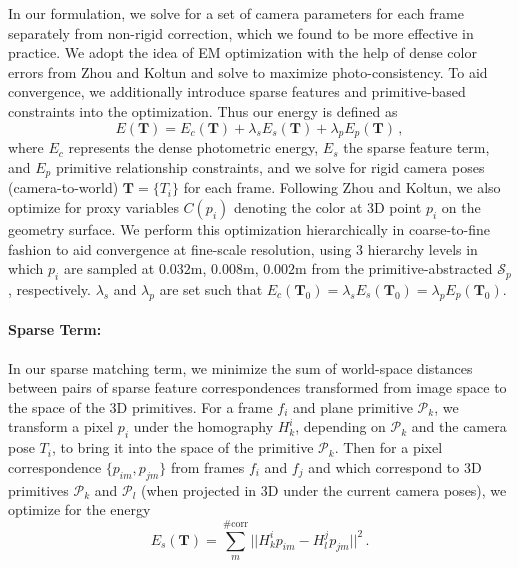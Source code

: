 In our formulation, we solve for a set of camera parameters for each frame separately from non-rigid correction, which we found to be more effective in practice. 
We adopt the idea of EM optimization with the help of dense color errors from Zhou and Koltun and solve to maximize photo-consistency.
To aid convergence, we additionally introduce sparse features and primitive-based constraints into the optimization.
Thus our energy is defined as
$$ E(\mathbf{T})=E_c(\mathbf{T}) + \lambda_s E_s(\mathbf{T}) + \lambda_p E_p(\mathbf{T})\,, $$
where $E_c$ represents the dense photometric energy, $E_s$ the sparse feature term, and $E_p$ primitive relationship constraints, and we solve for rigid camera poses (camera-to-world) $\mathbf{T}=\{T_i\}$ for each frame.
Following Zhou and Koltun, we also optimize for proxy variables $C(p_i)$ denoting the color at 3D point $p_i$ on the geometry surface.
We perform this optimization hierarchically in coarse-to-fine fashion to aid convergence at fine-scale resolution, using 3 hierarchy levels in which $p_i$ are sampled at $0.032$m, $0.008$m, $0.002$m from the primitive-abstracted $\mathcal{S}_p$, respectively.
$\lambda_s$ and $\lambda_p$ are set such that $E_c(\mathbf{T}_0)=\lambda_s E_s(\mathbf{T}_0) = \lambda_p E_p(\mathbf{T}_0)$.

\paragraph*{Sparse Term:}
In our sparse matching term, we minimize the sum of world-space distances between pairs of sparse feature correspondences transformed from image space to the space of the 3D primitives. 
For a frame $f_i$ and plane primitive $\mathcal{P}_k$, we transform a pixel $p_i$ under the homography $H_k^i$, depending on $\mathcal{P}_k$ and the camera pose $T_i$, to bring it into the space of the primitive $\mathcal{P}_k$.
Then for a pixel correspondence $\{p_{im},p_{jm}\}$ from frames $f_i$ and $f_j$ and which correspond to 3D primitives $\mathcal{P}_k$ and $\mathcal{P}_l$ (when projected in 3D under the current camera poses), we optimize for the energy
\begin{equation}
E_s(\mathbf{T}) = \sum_m^{\#\textrm{corr}} ||H_k^ip_{im} - H_l^j p_{jm}||^2\,.
\label{eq:pose-optim-sparse}
\end{equation}

